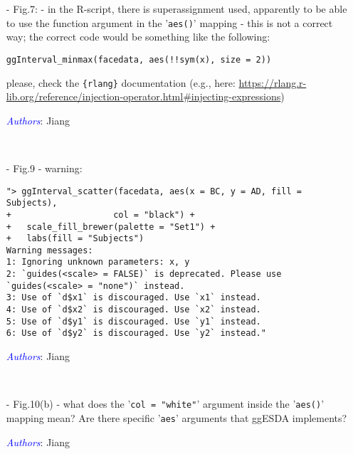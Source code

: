 \documentclass[11pt]{article}
\newcommand{\authors}[1]{

 \parbox{15cm}{\textcolor{blue}{\it Authors}: \color{red}#1}
 \\ \vspace{0.3cm}
}
\begin{document}
\begin{itemize}
\authors{Jiang/Wu}


\item[-] Fig.7: - in the R-script, there is superassignment used, apparently to be able to use the function argument in the '{\tt aes()}' mapping - this is not a correct way; the correct code would be something like the following:
\begin{verbatim}
ggInterval_minmax(facedata, aes(!!sym(x), size = 2))
\end{verbatim}
please, check the {\tt \{rlang\}} documentation (e.g., here:
\url{https://rlang.r-lib.org/reference/injection-operator.html\#injecting-expressions})
\authors{Jiang}




\item[-] Fig.9 - warning:
\begin{verbatim}
"> ggInterval_scatter(facedata, aes(x = BC, y = AD, fill = Subjects),
+                    col = "black") +
+   scale_fill_brewer(palette = "Set1") +
+   labs(fill = "Subjects")
Warning messages:
1: Ignoring unknown parameters: x, y
2: `guides(<scale> = FALSE)` is deprecated. Please use `guides(<scale> = "none")` instead.
3: Use of `d$x1` is discouraged. Use `x1` instead.
4: Use of `d$x2` is discouraged. Use `x2` instead.
5: Use of `d$y1` is discouraged. Use `y1` instead.
6: Use of `d$y2` is discouraged. Use `y2` instead."
\end{verbatim}
\authors{Jiang}


\item[-] Fig.10(b) - what does the '{\tt col = "white"}' argument inside the '{\tt aes()}' mapping mean? Are there specific '{\tt aes}' arguments that ggESDA implements?
\authors{Jiang}



\end{itemize}
\end{document}
